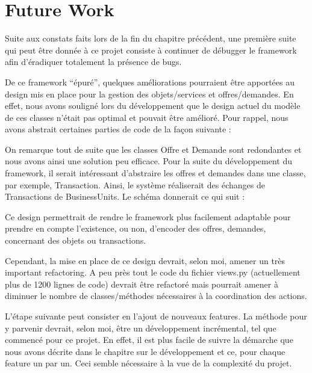 \section{Future Work}

Suite aux constats faits lors de la fin du chapitre précédent,  une première suite qui peut être donnée à ce projet consiste à continuer de débugger le framework afin d'éradiquer totalement la présence de bugs.  

De ce framework ``épuré'',  quelques améliorations pourraient être apportées au design mis en place pour la gestion des objets/services et offres/demandes.  En effet,  nous avons souligné lors du développement que le design actuel du modèle de ces classes n'était pas optimal et pouvait être amélioré.  Pour rappel,  nous avons abstrait certaines parties de code de la façon suivante : 
\vspace{0.5cm}
\begin{center}
\end{center}
\vspace{0.3cm}

On remarque tout de suite que les classes Offre et Demande sont redondantes et nous avons ainsi une solution peu efficace.  Pour la suite du développement du framework,  il serait intéressant d'abstraire les offres et demandes dans une classe,  par exemple,  Transaction.  Ainsi,  le système réaliserait des échanges de Transactions de BusinessUnits.  Le schéma donnerait ce qui suit : 
\vspace{0.5cm}
\begin{center}
\end{center}
\vspace{0.5cm}

Ce design permettrait de rendre le framework plus facilement adaptable pour prendre en compte l'existence,  ou non,  d'encoder des offres,  demandes,  concernant des objets ou transactions.  

Cependant,  la mise en place de ce design devrait,  selon moi,  amener un très important refactoring.  A peu près tout le code du fichier views.py (actuellement plus de 1200 lignes de code) devrait être refactoré mais pourrait amener à diminuer le nombre de classes/méthodes nécessaires à la coordination des actions.  

 L'étape suivante peut consister en l'ajout de nouveaux features.  La méthode pour y parvenir devrait,  selon moi,  être un développement incrémental,  tel que commencé pour ce projet. En effet,  il est plus facile de suivre la démarche que nous avons décrite dans le chapitre sur le développement et ce,  pour chaque feature un par un.  Ceci semble nécessaire à la vue de la complexité du projet.  

